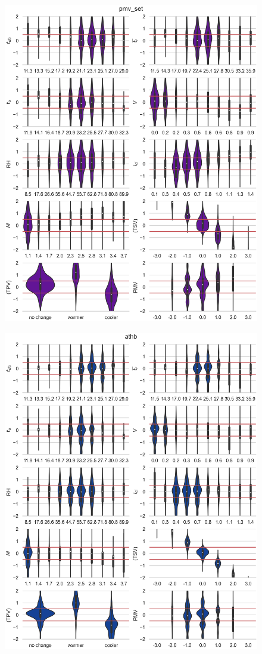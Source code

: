 \begin{figure}
    \centering
    \includegraphics[width=\textwidth]{figures/bias_pmv_set}
    \caption{}
    \label{fig:bias_pmv_set}
\end{figure}

\begin{figure}
    \centering
    \includegraphics[width=\textwidth]{figures/bias_athb}
    \caption{}
    \label{fig:bias_athb}
\end{figure}